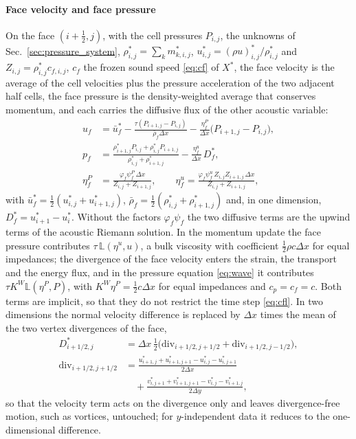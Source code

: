 \paragraph{Face velocity and face pressure}
On the face $(i+\tfrac12,j)$, with the cell pressures $P_{i,j}$, the unknowns of Sec.~\ref{sec:pressure_system}, $\rho^*_{i,j}=\sum_km^*_{k,i,j}$, $u^*_{i,j}=(\rho u)^*_{i,j}/\rho^*_{i,j}$ and $Z_{i,j}=\rho^*_{i,j}c_{f,i,j}$, $c_f$ the frozen
sound speed \eqref{eq:cf} of $X^*$, the face velocity is the average of the cell velocities plus the pressure acceleration of the two
adjacent half cells, the face pressure is the density-weighted average that conserves momentum, and each carries the
diffusive flux of the other acoustic variable:
\begin{equation}
\begin{aligned}
u_f&=\bar u^*_f-\frac{\tau(P_{i+1,j}-P_{i,j})}{\bar\rho_f\Delta x}-\frac{\eta^P_f}{\Delta x}\big(P_{i+1,j}-P_{i,j}\big),\\
p_f&=\frac{\rho^*_{i+1,j}P_{i,j}+\rho^*_{i,j}P_{i+1,j}}{\rho^*_{i,j}+\rho^*_{i+1,j}}-\frac{\eta^u_f}{\Delta x}\,D^*_f,\\
\eta^P_f&=\frac{\varphi_f\psi^P_f\,\Delta x}{Z_{i,j}+Z_{i+1,j}},\qquad \eta^u_f=\frac{\varphi_f\psi^u_f\,Z_{i,j}Z_{i+1,j}\,\Delta x}{Z_{i,j}+Z_{i+1,j}},
\end{aligned}
\label{eq:faces}
\end{equation}
with $\bar u^*_f=\tfrac12(u^*_{i,j}+u^*_{i+1,j})$, $\bar\rho_f=\tfrac12(\rho^*_{i,j}+\rho^*_{i+1,j})$ and, in one dimension, $D^*_f=u^*_{i+1}-u^*_i$. Without the
factors $\varphi_f\psi_f$ the two diffusive terms are the upwind terms of the acoustic Riemann solution. In the momentum update the
face pressure contributes $\tau\,\mathbb L(\eta^u,u)$, a bulk viscosity with coefficient $\tfrac12\rho c\Delta x$ for equal impedances; the
divergence of the face velocity enters the strain, the transport and the energy flux, and in the pressure equation
\eqref{eq:wave} it contributes $\tau K^W\mathbb L(\eta^P,P)$, with $K^W\eta^P=\tfrac12c\Delta x$ for equal impedances and $c_p=c_f=c$. Both terms are implicit, so that they do not restrict the time step \eqref{eq:cfl}. In two dimensions the
normal velocity difference is replaced by $\Delta x$ times the mean of the two vertex divergences of the face,
\begin{equation}
\begin{aligned}
D^*_{i+1/2,j}&=\Delta x\,\tfrac12\big(\mathrm{div}_{i+1/2,j+1/2}+\mathrm{div}_{i+1/2,j-1/2}\big),\\
\mathrm{div}_{i+1/2,j+1/2}&=\frac{u^*_{i+1,j}+u^*_{i+1,j+1}-u^*_{i,j}-u^*_{i,j+1}}{2\Delta x}\\
&\quad+\frac{v^*_{i,j+1}+v^*_{i+1,j+1}-v^*_{i,j}-v^*_{i+1,j}}{2\Delta y},
\end{aligned}
\label{eq:vertex_div}
\end{equation}
so that the velocity term acts on the divergence only and leaves divergence-free motion, such as vortices, untouched;
for $y$-independent data it reduces to the one-dimensional difference.

